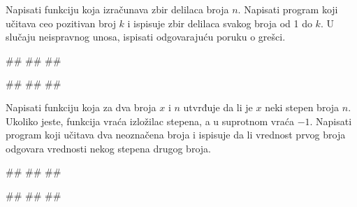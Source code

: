 \begin{Exercise}[label=FUN_03] 
 Napisati funkciju  koja izračunava
 zbir delilaca broja $n$. Napisati program koji učitava ceo pozitivan broj $k$ i
 ispisuje zbir delilaca svakog broja od 1 do $k$.
U slučaju neispravnog unosa, ispisati odgovarajuću poruku o grešci.

\begin{miditest}
\begin{upotreba}{1}
#\naslovInt#
##
##
\end{upotreba}
\end{miditest}
\begin{miditest}
\begin{upotreba}{2}
#\naslovInt#
##
##
\end{upotreba}
\end{miditest}

\end{Exercise}
\ifresenja 
\begin{Answer}[ref=FUN_03]
\end{Answer} 
\fi


\begin{Exercise}[label=FUN_04] 
Napisati funkciju  koja
za dva broja $x$ i $n$ utvrđuje da li je $x$ neki stepen broja
$n$. Ukoliko jeste, funkcija vraća izložilac stepena, a u suprotnom
vraća $-1$. Napisati program koji učitava dva neoznačena broja i ispisuje
da li vrednost prvog broja odgovara vrednosti nekog stepena drugog broja.

\begin{miditest}
\begin{upotreba}{1}
#\naslovInt#
##
##
\end{upotreba}
\end{miditest}
\begin{miditest}
\begin{upotreba}{2}
#\naslovInt#
##
##
\end{upotreba}
\end{miditest}

\end{Exercise}
\ifresenja 
\begin{Answer}[ref=FUN_04]
\end{Answer} 
\fi


